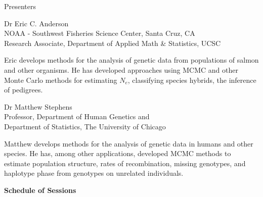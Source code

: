 
\vspace*{1in}
\begin{center}\color{section0}\bf\Large
\coursetitlepage
\end{center}
\es\bs
\begin{center}\color{section0} Presenters\end{center}
\enlargethispage*{1000pt}

{\color{section0}Dr Eric C. Anderson\\
NOAA - Southwest Fisheries Science Center, Santa Cruz, CA\\
Research Associate, Department of Applied Math \& Statistics, UCSC}

Eric develops methods for the analysis of genetic data from populations of salmon and other organisms.  He has developed approaches using MCMC and other Monte Carlo methods for estimating $N_e$, classifying species hybrids, the inference of pedigrees.

{\color{section0}Dr Matthew Stephens\\
Professor, Department of Human Genetics and\\
Department of Statistics, The University of Chicago}
  
Matthew develops methods for the analysis of genetic data in humans and other species. He has, among other applications, developed MCMC methods to estimate population structure, rates of recombination, missing genotypes, and haplotype phase from genotypes on unrelated individuals.

\es\bs
\begin{center}
{\color{section0}\bf\Large Schedule of Sessions}
\vspace*{.25in}
\enlargethispage*{1000pt}

%

%

\end{center}



